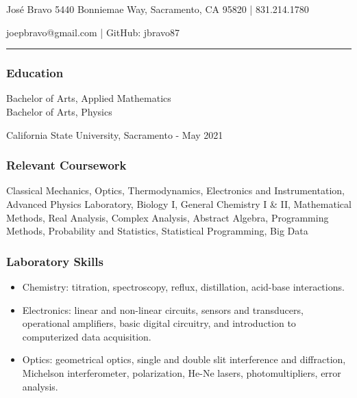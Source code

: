 \documentclass[letterpaper, 10 pt]{article}
\begin{document}
\centerline{\huge Jos\'e Bravo \hfill \normalsize 5440 Bonniemae Way, Sacramento, CA 95820 | 831.214.1780}
\hspace*{\fill} joepbravo@gmail.com | GitHub: jbravo87

\noindent\rule[0.10 ex]{\linewidth}{1.75 pt}

\subsubsection*{Education}
Bachelor of Arts, Applied Mathematics \\
Bachelor of Arts, Physics

California State University, Sacramento - May 2021 %
\subsubsection*{Relevant Coursework}
\quad Classical Mechanics, Optics, Thermodynamics, Electronics and Instrumentation, Advanced Physics Laboratory, Biology I, General Chemistry I \& II, Mathematical Methods, Real Analysis, Complex Analysis, Abstract Algebra, Programming Methods, Probability and Statistics, Statistical Programming, Big Data %

\subsubsection*{Laboratory Skills}
\begin{itemize}
\setlength\itemsep{0.15 em} %
\item Chemistry: titration, spectroscopy, reflux, distillation, acid-base interactions.
\item Electronics: linear and non-linear circuits, sensors and transducers, operational amplifiers, basic digital circuitry, and introduction to computerized data acquisition.
\item Optics: geometrical optics, single and double slit interference and diffraction, Michelson interferometer, polarization, He-Ne lasers, photomultipliers, error analysis.
\end{itemize}

\end{document}
